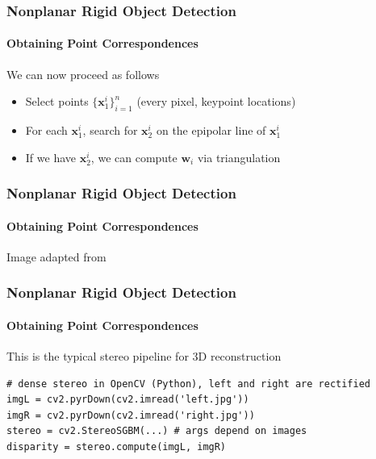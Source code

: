 \documentclass[xetex,professionalfont]{beamer}
\renewcommand{\vec}[1]{\ensuremath{\mathbf{#1}}}
\newcommand{\vw}{\vec{w}}
\newcommand{\vx}{\vec{x}}
\renewcommand\emph[1]{\textcolor{tuwcvl_inf_red}{#1}}
\begin{document}
\begin{frame}
\frametitle{Nonplanar Rigid Object Detection}
\framesubtitle{Obtaining Point Correspondences}

We can now proceed as follows
\begin{itemize}
    \item Select points $\{\vx^i_1\}_{i=1}^n$ (every pixel, keypoint locations)
    \item For each $\vx^i_1$, search for $\vx^i_2$ on the epipolar line of $\vx^i_1$ %
    \item If we have $\vx^i_2$, we can compute $\vw_i$ via \emph{triangulation}
\end{itemize}

\end{frame}


\begin{frame}
\frametitle{Nonplanar Rigid Object Detection}
\framesubtitle{Obtaining Point Correspondences}

\begin{center}
    {\centering Image adapted from \cite{prince12}}
\end{center}

\end{frame}


\begin{frame}[fragile]
\frametitle{Nonplanar Rigid Object Detection}
\framesubtitle{Obtaining Point Correspondences}

This is the typical \emph{stereo} pipeline for 3D reconstruction

\bigskip
\begin{verbatim}
# dense stereo in OpenCV (Python), left and right are rectified
imgL = cv2.pyrDown(cv2.imread('left.jpg'))
imgR = cv2.pyrDown(cv2.imread('right.jpg'))
stereo = cv2.StereoSGBM(...) # args depend on images
disparity = stereo.compute(imgL, imgR)
\end{verbatim}

\end{frame}
\end{document}
